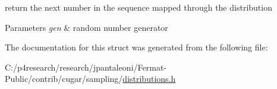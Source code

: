return the next number in the sequence mapped through the distribution


\begin{DoxyParams}{Parameters}
{\em gen} & random number generator \\
\hline
\end{DoxyParams}


The documentation for this struct was generated from the following file\+:\begin{DoxyCompactItemize}
\item 
C\+:/p4research/research/jpantaleoni/\+Fermat-\/\+Public/contrib/cugar/sampling/\hyperlink{distributions_8h}{distributions.\+h}\end{DoxyCompactItemize}
